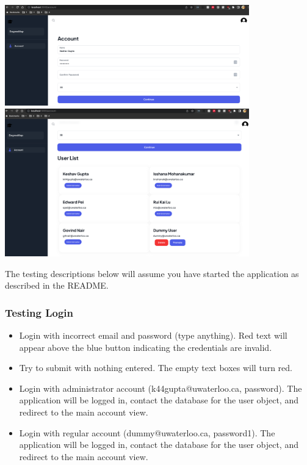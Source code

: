 \documentclass[12pt, a4paper]{article}
\begin{document}
\begin{center}
        \includegraphics[width=400px]{R6/i1}
        \includegraphics[width=400px]{R6/i2}
\end{center}
The testing descriptions below will assume you have started the application as described in the README.
\subsubsection*{Testing Login}
\begin{itemize}
    \item Login with incorrect email and password (type anything). Red text will appear above the blue button indicating the credentials are invalid.
    \item Try to submit with nothing entered. The empty text boxes will turn red.
    \item Login with administrator account (k44gupta@uwaterloo.ca, password). The application will be logged in, contact the database for the user object, and redirect to the main account view.
    \item Login with regular account (dummy@uwaterloo.ca, password1).  The application will be logged in, contact the database for the user object, and redirect to the main account view.
\end{itemize}
\end{document}
